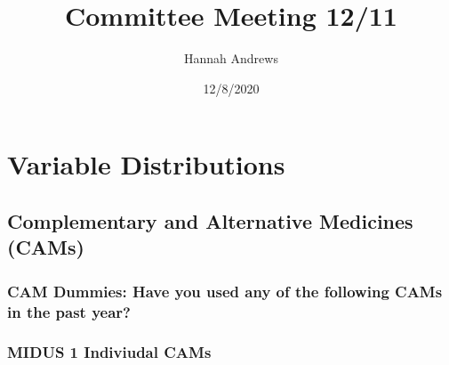\documentclass[
]{article}
\title{Committee Meeting 12/11}
\author{Hannah Andrews}
\date{12/8/2020}
\begin{document}
\maketitle

\hypertarget{variable-distributions}{%
\section{Variable Distributions}\label{variable-distributions}}

\hypertarget{complementary-and-alternative-medicines-cams}{%
\subsection{Complementary and Alternative Medicines
(CAMs)}\label{complementary-and-alternative-medicines-cams}}

\hypertarget{cam-dummies-have-you-used-any-of-the-following-cams-in-the-past-year}{%
\subsubsection{CAM Dummies: Have you used any of the following CAMs in
the past
year?}\label{cam-dummies-have-you-used-any-of-the-following-cams-in-the-past-year}}

\hypertarget{midus-1-indiviudal-cams}{%
\subsubsection{MIDUS 1 Indiviudal CAMs}\label{midus-1-indiviudal-cams}}
\end{document}
